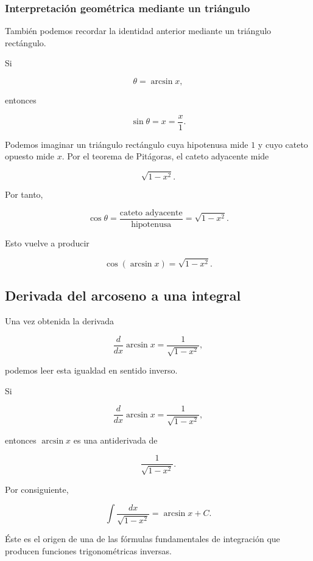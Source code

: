 \documentclass[12pt]{article}
\theoremstyle{definition}
\theoremstyle{remark}
\begin{document}
\subsubsection*{Interpretación geométrica mediante un triángulo}

También podemos recordar la identidad anterior mediante un triángulo
rectángulo.

Si

\[
\theta=\arcsin x,
\]

entonces

\[
\sin\theta=x=\frac{x}{1}.
\]

Podemos imaginar un triángulo rectángulo cuya hipotenusa mide $1$ y
cuyo cateto opuesto mide $x$. Por el teorema de Pitágoras, el cateto
adyacente mide

\[
\sqrt{1-x^2}.
\]

Por tanto,

\[
\cos\theta
=
\frac{\text{cateto adyacente}}
     {\text{hipotenusa}}
=
\sqrt{1-x^2}.
\]

Esto vuelve a producir

\[
\cos(\arcsin x)
=
\sqrt{1-x^2}.
\]

\subsection*{Derivada del arcoseno a una integral}

Una vez obtenida la derivada

\[
\frac{d}{dx}\arcsin x
=
\frac{1}{\sqrt{1-x^2}},
\]

podemos leer esta igualdad en sentido inverso.

Si

\[
\frac{d}{dx}\arcsin x
=
\frac{1}{\sqrt{1-x^2}},
\]

entonces $\arcsin x$ es una antiderivada de

\[
\frac{1}{\sqrt{1-x^2}}.
\]

Por consiguiente,

\[
\boxed{
\int\frac{dx}{\sqrt{1-x^2}}
=
\arcsin x+C.
}
\]

Éste es el origen de una de las fórmulas fundamentales de integración
que producen funciones trigonométricas inversas.

\end{document}

